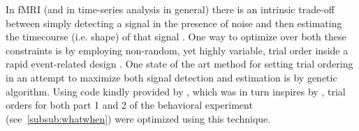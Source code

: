 \documentclass[doc,12pt]{apa}        %
\begin{document}
In fMRI (and in time-series analysis in general) there is an intrinsic trade-off between simply detecting a signal in the presence of noise and then estimating the timecourse (i.e. shape) of that signal \cite{Dale:1999p7901,Birn:2002p1777,Liu:2004p2141}.   One way to optimize over both these constraints is by employing non-random, yet highly variable, trial order inside a rapid event-related design \cite{Miezin:2000p7924}.  One state of the art method for setting trial ordering in an attempt to maximize both signal detection and estimation is by genetic algorithm. Using code kindly provided by , which was in turn inspires by \cite{Wager:2003p2980}, trial orders for both part 1 and 2 of the behavioral experiment (see~\ref{subsub:whatwhen}) were optimized using this technique.


\newpage

\end{document}
